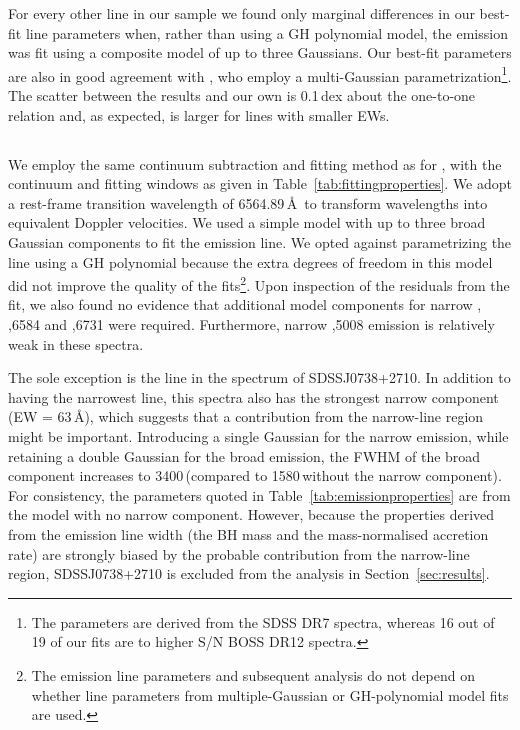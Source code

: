 For every other  line in our sample we found only marginal differences in our best-fit line parameters when, rather than using a GH polynomial model, the  emission was fit using a composite model of up to three Gaussians. 
Our best-fit parameters are also in good agreement with \citet{shen11}, who employ a multi-Gaussian parametrization\footnote{The \citet{shen11} parameters are derived from the SDSS DR7 spectra, whereas 16 out of 19 of our fits are to higher S/N BOSS DR12 spectra.}.  
The scatter between the \citet{shen11} results and our own is 0.1\,dex about the one-to-one relation and, as expected, is larger for lines with smaller EWs. 

\subsection{\ha}

We employ the same continuum subtraction and fitting method as for , with the continuum and fitting windows as given in Table~\ref{tab:fittingproperties}. 
We adopt a rest-frame transition wavelength of 6564.89\,\AA\, to transform wavelengths into equivalent Doppler velocities. 
We used a simple model with up to three broad Gaussian components to fit the \ha emission line.
We opted against parametrizing the \ha line using a GH polynomial because the extra degrees of freedom in this model did not improve the quality of the fits\footnote{The emission line parameters and subsequent analysis do not depend on whether line parameters from multiple-Gaussian or GH-polynomial model fits are used.}.
Upon inspection of the residuals from the fit, we also found no evidence that additional model components for narrow \hans, ,6584 and ,6731 were required.
Furthermore, narrow ,5008 emission is relatively weak in these spectra.

The sole exception is the \ha line in the spectrum of SDSSJ0738+2710.
In addition to having the narrowest \ha line, this spectra also has the strongest narrow  component (EW = 63\,\AA), which suggests that a contribution from the narrow-line region might be important.  
Introducing a single Gaussian for the narrow emission, while retaining a double Gaussian for the broad emission, the FWHM of the broad component increases to 3400\,\kms (compared to 1580\,\kms without the narrow component). 
For consistency, the parameters quoted in Table~\ref{tab:emissionproperties} are from the model with no narrow component. 
However, because the properties derived from the emission line width (the BH mass and the mass-normalised accretion rate) are strongly biased by the probable contribution from the narrow-line region, SDSSJ0738+2710 is excluded from the analysis in Section~\ref{sec:results}. 

